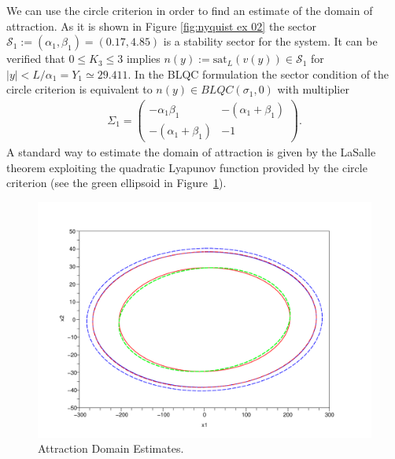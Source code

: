 \documentclass[letterpaper,10pt,twocolumn,journal,final]{IEEEtran}
\newcommand{\sat}{\mathrm{sat}}
\begin{document}
We can use the circle criterion in order to find an estimate of the domain of attraction. As it is shown in Figure \ref{fig:nyquist ex 02} the sector $\mathcal{S}_1:=(\alpha_1,\beta_1)=(0.17, 4.85)$ is a stability sector for the system.
It can be verified that $0\leq K_3 \leq 3$ implies $n(y):=\sat_L(v(y))\in\mathcal{S}_1$
for $|y|<L/\alpha_1 = Y_1 \simeq 29.411$.
In the BLQC formulation the sector condition of the circle criterion is equivalent to $n(y)\in BLQC(\sigma_1,0)$ with multiplier
\begin{align}
	\Sigma_1=	\left(\begin{array}{cc}
				-\alpha_1\beta_1 & -(\alpha_1+\beta_1)\\ -(\alpha_1+\beta_1) & -1
			\end{array}\right).
\end{align}
A standard way to estimate the domain of attraction is given by the LaSalle theorem exploiting the quadratic Lyapunov function provided by the circle criterion
(see the green ellipsoid in Figure~\ref{fig:AttractionDomains}).
\begin{figure}
	\centering
	\includegraphics[width=0.9\columnwidth]{AttractionDomains}
	\caption{Attraction Domain Estimates\label{fig:AttractionDomains}.}
\end{figure}
\end{document}
